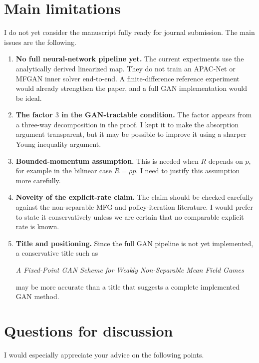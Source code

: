 \documentclass[11pt]{article}
\begin{document}
\section{Main limitations}

I do not yet consider the manuscript fully ready for journal submission. The main issues are the following.

\begin{enumerate}[leftmargin=*]
  \item \textbf{No full neural-network pipeline yet.} The current experiments use the analytically derived linearized map. They do not train an APAC-Net or MFGAN inner solver end-to-end. A finite-difference reference experiment would already strengthen the paper, and a full GAN implementation would be ideal.

  \item \textbf{The factor $3$ in the GAN-tractable condition.} The factor appears from a three-way decomposition in the proof. I kept it to make the absorption argument transparent, but it may be possible to improve it using a sharper Young inequality argument.

  \item \textbf{Bounded-momentum assumption.} This is needed when $R$ depends on $p$, for example in the bilinear case $R=\rho p$. I need to justify this assumption more carefully.

  \item \textbf{Novelty of the explicit-rate claim.} The claim should be checked carefully against the non-separable MFG and policy-iteration literature. I would prefer to state it conservatively unless we are certain that no comparable explicit rate is known.

  \item \textbf{Title and positioning.} Since the full GAN pipeline is not yet implemented, a conservative title such as
  \begin{center}
  \emph{A Fixed-Point GAN Scheme for Weakly Non-Separable Mean Field Games}
  \end{center}
  may be more accurate than a title that suggests a complete implemented GAN method.
\end{enumerate}

\section{Questions for discussion}

I would especially appreciate your advice on the following points.
\end{document}
